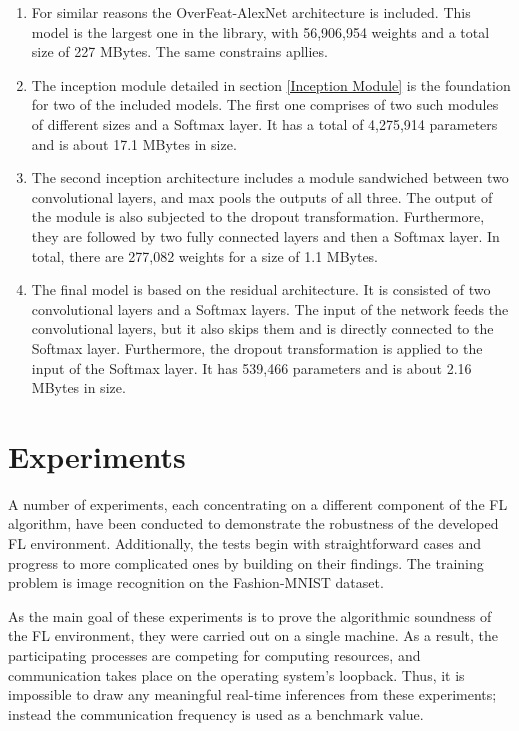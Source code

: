 \begin{enumerate}
    \item For similar reasons the OverFeat-AlexNet architecture is included. This model is the largest one in the library, with 56,906,954 weights and a total size of 227 MBytes. The same constrains apllies.
    
    \item The inception module detailed in section \ref{Inception Module} is the foundation for two of the included models. The first one comprises of two such modules of different sizes and a Softmax layer. It has a total of 4,275,914 parameters and is about 17.1 MBytes in size.
    
    \item The second inception architecture includes a module sandwiched between two convolutional layers, and max pools the outputs of all three. The output of the module is also subjected to the dropout transformation. Furthermore, they are followed by two fully connected layers and then a Softmax layer. In total, there are 277,082 weights for a size of 1.1 MBytes.
    
    \item The final model is based on the residual architecture. It is consisted of two convolutional layers and a Softmax layers. The input of the network feeds the convolutional layers, but it also skips them and is directly connected to the Softmax layer. Furthermore, the dropout transformation is applied to the input of the Softmax layer. It has 539,466 parameters and is about 2.16 MBytes in size.
\end{enumerate}

\section{Experiments}
A number of experiments, each concentrating on a different component of the FL algorithm, have been conducted to demonstrate the robustness of the developed FL environment. Additionally, the tests begin with straightforward cases and progress to more complicated ones by building on their findings. The training problem is image recognition on the Fashion-MNIST dataset. %

As the main goal of these experiments is to prove the algorithmic soundness of the FL environment, they were carried out on a single machine. As a result, the participating processes are competing for computing resources, and communication takes place on the operating system's loopback. Thus, it is impossible to draw any meaningful real-time inferences from these experiments; instead the communication frequency is used as a benchmark value. %

